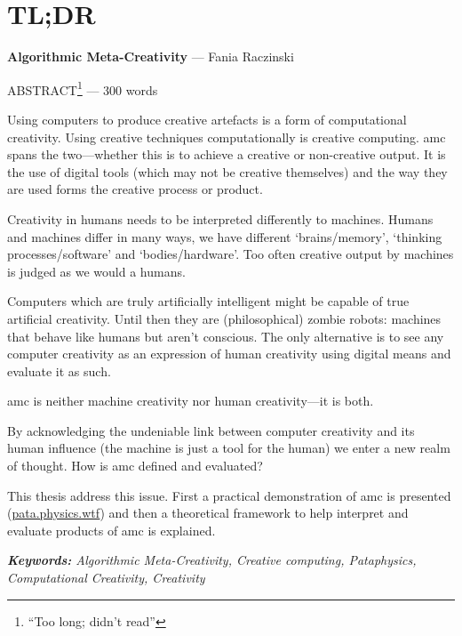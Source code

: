 
\pagestyle{empty}

\chapter{TL;DR}
\label{abstract}

{\Large \textbf{Algorithmic Meta-Creativity}} --- Fania Raczinski

\vspace{0.5cm}
ABSTRACT\footnote{``Too long; didn't read''} --- 300 words

\begin{draft}
  Using computers to produce creative artefacts is a form of computational creativity. Using creative techniques computationally is creative computing. \gls{amc} spans the two---whether this is to achieve a creative or non-creative output. It is the use of digital tools (which may not be creative themselves) and the way they are used forms the creative process or product. 

  Creativity in humans needs to be interpreted differently to machines. Humans and machines differ in many ways, we have different `brains/memory', `thinking processes/software' and `bodies/hardware'. Too often creative output by machines is judged as we would a humans. 

  Computers which are truly artificially intelligent might be capable of true artificial creativity. Until then they are (philosophical) zombie robots: machines that behave like humans but aren't conscious. The only alternative is to see any computer creativity as an expression of human creativity using digital means and evaluate it as such.

  \gls{amc} is neither machine creativity nor human creativity---it is both.

  By acknowledging the undeniable link between computer creativity and its human influence (the machine is just a tool for the human) we enter a new realm of thought. How is \gls{amc} defined and evaluated?

  This thesis address this issue. First a practical demonstration of \gls{amc} is presented (\url{pata.physics.wtf}) and then a theoretical framework to help interpret and evaluate products of \gls{amc} is explained.
\end{draft}

\textit{\textbf{Keywords:} Algorithmic Meta-Creativity, Creative computing, Pataphysics, Computational Creativity, Creativity}

\clearpage

